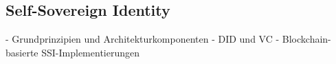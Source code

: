 \subsection{Self-Sovereign Identity} \label{sec:Self-Sovereign Identity}

- Grundprinzipien und Architekturkomponenten
- DID und VC
- Blockchain-basierte SSI-Implementierungen